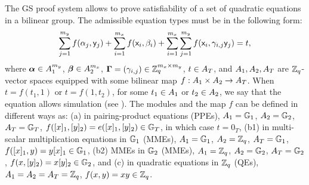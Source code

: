 The GS proof system allows to prove satisfiability of a set of quadratic equations in a bilinear group. The admissible equation types must be in the following form:
\begin{equation}\label{gseq}
\sum_{j=1}^{m_y} f(\alpha_j, \mathsf{y}_j)+\sum_{i=1}^{m_x} f(\mathsf{x}_i, \beta_i)+\sum_{i=1}^{m_x} \sum_{j=1}^{m_y}  f(\mathsf{x}_i,\gamma_{i,j} \mathsf{y}_j)=t,
\end{equation}
 where $\boldsymbol \alpha  \in A_1^{m_y}$, $\boldsymbol \beta  \in A_2^{m_x}$, $\mathbf{{\Gamma}}=(\gamma_{i,j}) \in \mathbb{Z}_q^{m_x\times m_y}$, $t \in A_T$, and $A_1,A_2,A_T$ are $\mathbb{Z}_q$-vector spaces equipped with some bilinear map $f:A_1\times A_2 \rightarrow A_T$. When $t=f(t_1,1)$ or $t=f(1,t_2)$, for some $t_1\in A_1$ or $t_2\in A_2$, we say that the equation allows simulation (see \cite{SIAM:GroSah12}). The modules and the map $f$ can be defined in different ways as: (a) in pairing-product equations (PPEs), $A_1=\mathbb{G}_1$, $A_2=\mathbb{G}_2$, $A_T=\mathbb{G}_T$, $f([x]_1,[y]_2)=e([x]_1,[y]_2) \in \mathbb{G}_T$, in which case $t=0_{T}$, (b1) in multi-scalar multiplication equations in $\mathbb{G}_1$ (MMEs), $A_1=\mathbb{G}_1$, $A_2=\mathbb{Z}_q$, $A_T=\mathbb{G}_1$, $f([x]_1,y)=y [x]_1 \in \mathbb{G}_1$,  (b2) MMEs in $\mathbb{G}_2$ (MMEs),  $A_1=\mathbb{Z}_q$, $A_2=\mathbb{G}_2$, $A_T=\mathbb{G}_2$, $f(x,[y]_2)=x [y]_2 \in \mathbb{G}_2$, and (c) in quadratic equations in $\mathbb{Z}_q$ (QEs), $A_1=A_2=A_T=\mathbb{Z}_q$, $f(x,y)=xy \in \mathbb{Z}_q$. 

